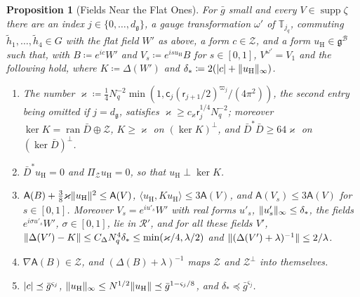 \documentclass[11pt]{preprint}
\DeclarePairedDelimiter{\abs}{\lvert}{\rvert}
\DeclarePairedDelimiter{\norm}{\lVert}{\rVert}
\numberwithin{equation}{section}
\newtheorem{proposition}[theorem]{Proposition}
\theoremstyle{definition}
\theoremstyle{remark}
\theoremstyle{plain}
\begin{document}
\begin{proposition}[Fields Near the Flat Ones]\label{prop:near-flat}
For $\bar g$ small and every $V \in \operatorname{supp}\zeta$ there are an index $j \in \{ 0, \dots, d_{\mathfrak g} \}$, a gauge transformation $\omega'$ of $\mathbb T_{j_q}$, commuting $\tilde h_1, \dots, \tilde h_4 \in G$ with the flat field $W'$ as above, a form $c \in \mathcal Z$, and a form $u_{\mathrm H} \in \mathfrak g^{\mathcal B}$ such that, with $B \coloneqq e^{ic}W'$ and $V_s \coloneqq e^{isu_{\mathrm H}}B$ for $s \in [0, 1]$, $V^{\omega'} = V_1$ and the following hold, where $K \coloneqq \Delta(W')$ and $\delta_* \coloneqq 2(\abs c + \norm{u_{\mathrm H}}_\infty)$.
\begin{enumerate}[label=(\roman*)]
\item The number $\varkappa \coloneqq \frac14N_q^{-2}\min(1, \mathsf c_j(\mathsf r_{j+1}/2)^{\varpi_j}/(4\pi^2))$, the second entry being omitted if $j = d_{\mathfrak g}$, satisfies $\varkappa \geq c_\varkappa\mathsf r_j^{1/4}N_q^{-2}$; moreover $\ker K = \operatorname{ran}\bar D \oplus \mathcal Z$, $K \geq \varkappa$ on $(\ker K)^\perp$, and $\bar D^*\bar D \geq 64\varkappa$ on $(\ker\bar D)^\perp$.
\item $\bar D^*u_{\mathrm H} = 0$ and $\Pi_{\mathcal Z}u_{\mathrm H} = 0$, so that $u_{\mathrm H} \perp \ker K$.
\item $\mathsf A(B) + \frac38\varkappa\norm{u_{\mathrm H}}^2 \leq \mathsf A(V)$, $\langle u_{\mathrm H}, Ku_{\mathrm H}\rangle \leq 3\mathsf A(V)$, and $\mathsf A(V_s) \leq 3\mathsf A(V)$ for $s \in [0, 1]$. Moreover $V_s = e^{iu'_s}W'$ with real forms $u'_s$, $\norm{u'_s}_\infty \leq \delta_*$, the fields $e^{i\sigma u'_s}W'$, $\sigma \in [0, 1]$, lie in $\mathcal R'$, and for all these fields $V'$, $\norm{\Delta(V') - K} \leq C_\Delta N_q^4\delta_* \leq \min(\varkappa/4, \lambda/2)$ and $\norm{(\Delta(V') + \lambda)^{-1}} \leq 2/\lambda$.
\item $\nabla\mathsf A(B) \in \mathcal Z$, and $(\Delta(B) + \lambda)^{-1}$ maps $\mathcal Z$ and $\mathcal Z^\perp$ into themselves.
\item $\abs c \preceq \bar g^{\varsigma_j}$, $\norm{u_{\mathrm H}}_\infty \leq N^{1/2}\norm{u_{\mathrm H}} \preceq \bar g^{1-\varsigma_j/8}$, and $\delta_* \preceq \bar g^{\varsigma_j}$.
\end{enumerate}
\end{proposition}
\end{document}
